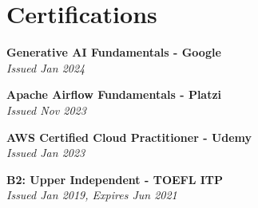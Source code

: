 \documentclass[letterpaper,11pt]{article}
\begin{document}
 
\section{Certifications}
  \begin{itemize}[leftmargin=0.15in, label={}]
  \small{\item{
     \textbf{Generative AI Fundamentals - Google} \\
     \textit{Issued Jan 2024} \\
    }}
    \small{\item{
     \textbf{Apache Airflow Fundamentals - Platzi} \\
     \textit{Issued Nov 2023} \\
    }}
    \small{\item{
     \textbf{AWS Certified Cloud Practitioner - Udemy} \\
     \textit{Issued Jan 2023} \\
    }}
    \small{\item{
     \textbf{B2: Upper Independent - TOEFL ITP} \\
     \textit{Issued Jan 2019, Expires Jun 2021} \\
    }}
 \end{itemize}


\end{document}
